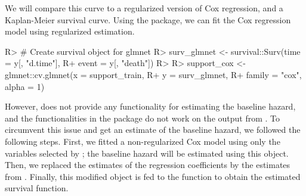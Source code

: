 \documentclass[
]{jss}
\begin{document}
\begin{CodeChunk}

\end{CodeChunk}

We will compare this curve to a regularized version of Cox regression,
and a Kaplan-Meier survival curve. Using the  package, we
can fit the Cox regression model using regularized estimation.

\begin{CodeChunk}

\begin{CodeInput}
R> # Create survival object for glmnet
R> surv_glmnet <- survival::Surv(time = y[, "d.time"], 
R+                               event = y[, "death"])
R> 
R> support_cox <- glmnet::cv.glmnet(x = support_train, 
R+                                  y = surv_glmnet,
R+                                  family = "cox", alpha = 1)
\end{CodeInput}
\end{CodeChunk}

However,  does not provide any functionality for estimating
the baseline hazard, and the functionalities in the 
package do not work on the output from . To circumvent
this issue and get an estimate of the baseline hazard, we followed the
following steps. First, we fitted a non-regularized Cox model using only
the variables selected by ; the baseline hazard will be
estimated using this object. Then, we replaced the estimates of the
regression coefficients by the estimates from . Finally,
this modified  object is fed to the 
function to obtain the estimated survival function.
\end{document}
